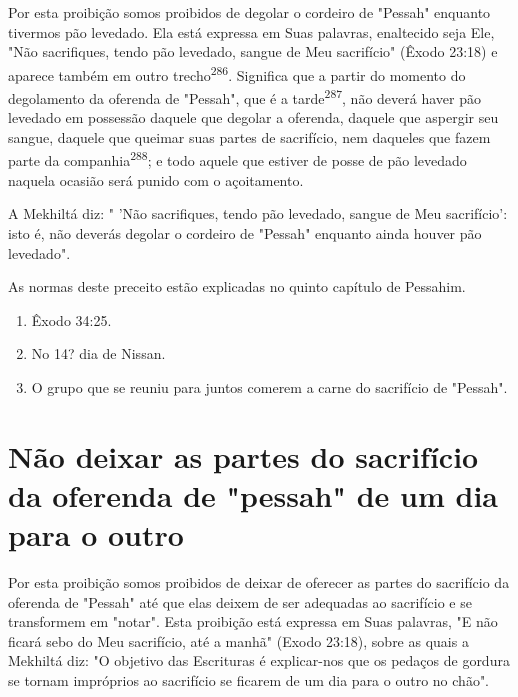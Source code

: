 \begin{itemize}
\begin{enumrate}
\begin{itemize}
\begin{itemize}
\begin{itemize}
Por esta proibição somos proibidos de degolar o cordeiro de "Pes­sah"
enquanto tivermos pão levedado. Ela está expressa em Suas palavras,
enal­tecido seja Ele, "Não sacrifiques, tendo pão levedado, sangue de
Meu sacrifí­cio" (Êxodo 23:18) e aparece também em outro
trecho\textsuperscript{286}. Significa que a par­tir do momento do
degolamento da oferenda de "Pessah", que é a tarde\textsuperscript{287},
não deverá haver pão levedado em possessão daquele que degolar a
oferenda, daquele que aspergir seu sangue, daquele que queimar suas
partes de sacrifício, nem daqueles que fazem parte da
companhia\textsuperscript{288}; e todo aquele que estiver de posse de
pão levedado naquela ocasião será punido com o açoitamento.

A Mekhiltá diz: " 'Não sacrifiques, tendo pão levedado, sangue de Meu
sacrifício': isto é, não deverás degolar o cordeiro de "Pessah" enquanto
ainda houver pão levedado".


As normas deste preceito estão explicadas no quinto capítulo de
Pessahim.

\begin{enumerate}
\def\labelenumi{\arabic{enumi}.}
\setcounter{enumi}{285}
\item
 
 Êxodo 34:25.
 
\item
 
 No 14? dia de Nissan.
 
\item
 
 O grupo que se reuniu para juntos comerem a carne do sacrifício de
 "Pessah".
 
\end{enumerate}



\section{Não deixar as partes do sacrifício da oferenda de "pessah" 
de um dia para o outro}

Por esta proibição somos proibidos de deixar de oferecer as partes do
sacrifício da oferenda de "Pessah" até que elas deixem de ser adequadas
ao sacrifício e se transformem em "notar". Esta proibição está expressa
em Suas palavras, "E não ficará sebo do Meu sacrifício, até a manhã"
(Exodo 23:18), sobre as quais a Mekhiltá diz: "O objetivo das Escrituras
é explicar-nos que os pedaços de gordura se tornam impróprios ao
sacrifício se ficarem de um dia para o outro no chão".


\end{itemize}
\end{itemize}
\end{itemize}
\end{enumrate}
\end{itemize}

